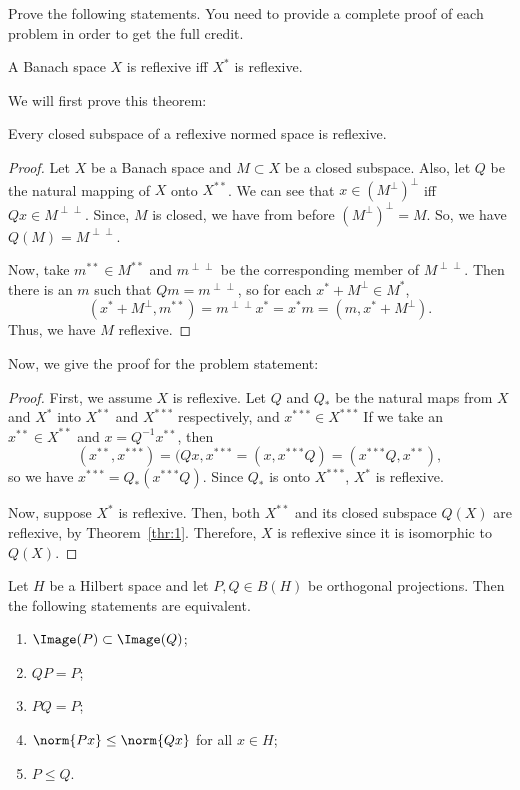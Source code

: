\documentclass[12pt,letterpaper,twoside]{hmcpset}
\begin{document}
\noindent Prove the following statements. You need to provide a complete proof of each problem in order to get the full credit.

\begin{problem}[1][10]
  A Banach space $X$ is reflexive iff $X^*$ is reflexive.
\end{problem}

\begin{solution}
  We will first prove this theorem:
  \begin{thm}
    \label{thr:1}
    Every closed subspace of a reflexive normed space is reflexive.
  \end{thm}
  \begin{proof}
    Let $X$ be a Banach space and $M \subset X$ be a closed subspace.
    Also, let $Q$ be the natural mapping of $X$ onto $X^{**}$.
    We can see that $x \in (M^\perp)^\perp$ iff $Qx \in M^{\perp\perp}$.
    Since, $M$ is closed, we have from before $(M^\perp)^\perp = M$.
    So, we have $Q(M) = M^{\perp\perp}$.
    
    Now, take $m^{**} \in M^{**}$  and $m^{\perp\perp}$ be the corresponding member of $ M^{\perp\perp}$.
    Then there is an $m$ such that $Qm = m^{\perp\perp}$, so for each $x^* + M^\perp \in M^*$, \[
    (x^* + M^\perp, m^{**}) = m^{\perp\perp}x^* = x^*m = (m,x^* + M^\perp).
    \]
    Thus, we have $M$ reflexive.
  \end{proof}
  Now, we give the proof for the problem statement:
  \begin{proof}
   First, we assume $X$ is reflexive.
   Let $Q$ and $Q_*$ be the natural maps from $X$ and $X^*$ into $X^{**}$ and $X^{***}$ respectively, and $x^{***} \in X^{***}$
   If we take an $x^{**} \in X^{**}$ and $x = Q^{-1}x^{**}$, then \[
   (x^{**},x^{***}) = (Qx,x^{***} = (x,x^{***}Q) = (x^{***}Q, x^{**}),
   \]
   so we have $x^{***} = Q_*(x^{***}Q)$.
   Since $Q_*$ is onto $X^{***}$, $X^*$ is reflexive.

   Now, suppose $X^*$ is reflexive.
   Then, both $X^{**}$ and its closed subspace $Q(X)$ are reflexive, by Theorem~\ref{thr:1}.
   Therefore, $X$ is reflexive since it is isomorphic to $Q(X)$.
  \end{proof}
\end{solution}

\begin{problem}[2][15]
  Let $H$ be a Hilbert space and let $P,Q \in B(H)$ be orthogonal projections.
  Then the following statements are equivalent.
  
  \begin{enumerate}[label=(\alph*)]
  \item $\Image(P) \subset \Image(Q)$;
    \item $QP = P$;
      \item $PQ = P$;
    \item $\norm{Px} \leq \norm{Qx}$ for all $x \in H$;
    \item $P \leq Q$.
  \end{enumerate}
\end{problem}
\end{document}
